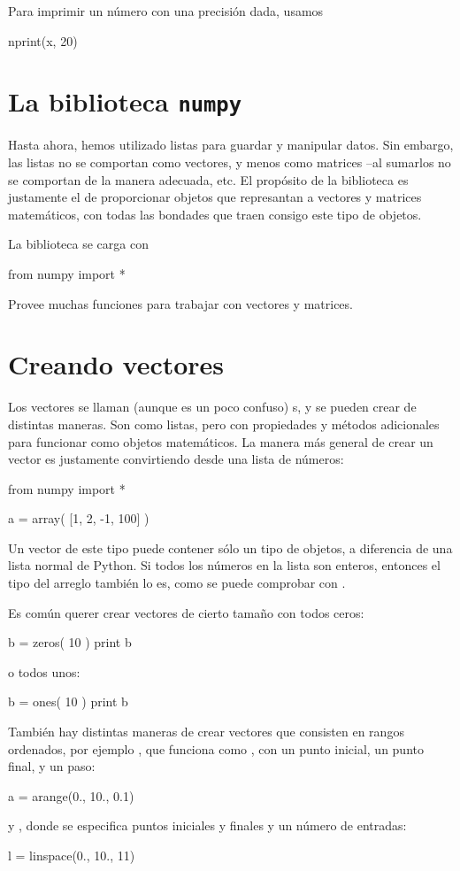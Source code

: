 Para imprimir un número con una precisión dada, usamos
\begin{python}
nprint(x, 20)
\end{python}

\section{La biblioteca \texttt{numpy}}
Hasta ahora, hemos utilizado listas para guardar y manipular datos. Sin embargo, las listas no se comportan como vectores, y menos como matrices --al sumarlos no se comportan de la manera adecuada, etc. El propósito de la biblioteca  es justamente el de proporcionar objetos que represantan a vectores y matrices matemáticos, con todas las bondades que traen consigo este tipo de objetos.

La biblioteca se carga con
\begin{python}
from numpy import *
\end{python}
Provee muchas funciones para trabajar con vectores y matrices.

\section{Creando vectores}
Los vectores se llaman (aunque es un poco confuso) s, y se pueden crear de distintas maneras. 
Son como listas, pero con propiedades y métodos adicionales para funcionar como objetos matemáticos.
La manera más general de crear un vector es justamente convirtiendo desde una lista de números:
\begin{python}
from numpy import *

a = array( [1, 2, -1, 100] )
\end{python}
Un vector de este tipo puede contener sólo un tipo de objetos, a diferencia de una lista normal de Python.
Si todos los números en la lista son enteros, entonces el tipo del arreglo también lo es, como se puede comprobar con .

Es común querer crear vectores de cierto tamaño con todos ceros:
\begin{python}
b = zeros( 10 )
print b
\end{python}
o todos unos:
\begin{python}
b = ones( 10 )
print b
\end{python}

También hay distintas maneras de crear vectores que consisten en rangos ordenados, por ejemplo , que funciona como , con un punto inicial, un punto final, y un paso:
\begin{python}
a = arange(0., 10., 0.1)
\end{python}
y , donde se especifica puntos iniciales y finales y un número de entradas:
\begin{python}
l = linspace(0., 10., 11)
\end{python}


